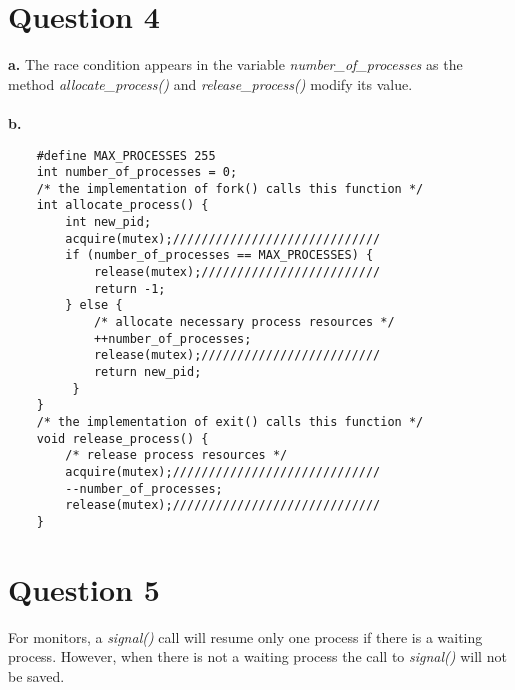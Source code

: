 \documentclass[11pt]{article}
\begin{document}
\section*{Question 4}
\textbf{a.} The race condition appears in the variable 
\emph{number\_of\_processes} as the method 
\emph{allocate\_process()} and \emph{release\_process()} 
modify its value. \\\\
\textbf{b.}
\begin{verbatim}
    #define MAX_PROCESSES 255
    int number_of_processes = 0;
    /* the implementation of fork() calls this function */
    int allocate_process() {
        int new_pid;
        acquire(mutex);/////////////////////////////
        if (number_of_processes == MAX_PROCESSES) {
            release(mutex);/////////////////////////
            return -1;
        } else {
            /* allocate necessary process resources */
            ++number_of_processes;
            release(mutex);/////////////////////////
            return new_pid;
         }
    }
    /* the implementation of exit() calls this function */
    void release_process() {
        /* release process resources */
        acquire(mutex);/////////////////////////////
        --number_of_processes;
        release(mutex);/////////////////////////////
    }
\end{verbatim}


\section*{Question 5}
For monitors, a \emph{signal()} call will resume only one 
process if there is a waiting process. However, when there 
is not a waiting process the call to \emph{signal()} will 
not be saved.
\end{document}
